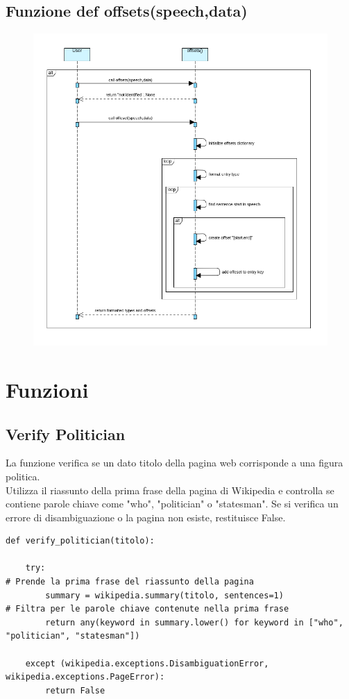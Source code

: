 \documentclass{article}
\begin{document}
	\subsection{Funzione def offsets(speech,data)}
		\begin{figure}[H]
		\centering
		\includegraphics[width=1.0\textwidth]{immagini/offset}
	\end{figure}
\newpage
	\section{Funzioni}
		
		\subsection{Verify Politician}
La funzione verifica se un dato titolo della pagina web corrisponde a una figura politica. \\ Utilizza il riassunto della prima frase della pagina di Wikipedia e controlla se contiene parole chiave come "who", "politician" o "statesman". Se si verifica un errore di disambiguazione o la pagina non esiste, restituisce False.
		\begin{lstlisting}
def verify_politician(titolo):

	try:
# Prende la prima frase del riassunto della pagina
		summary = wikipedia.summary(titolo, sentences=1)
# Filtra per le parole chiave contenute nella prima frase
		return any(keyword in summary.lower() for keyword in ["who", "politician", "statesman"])

	except (wikipedia.exceptions.DisambiguationError, wikipedia.exceptions.PageError):
		return False
		\end{lstlisting}
		
\end{document}
